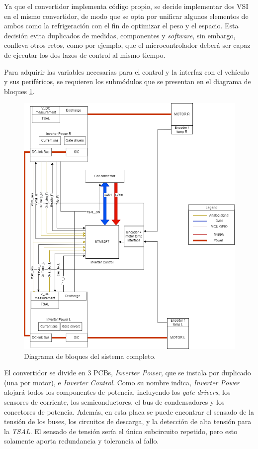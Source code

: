 Ya que el convertidor implementa código propio, se decide implementar dos VSI en el mismo convertidor, de modo que se opta por unificar algunos elementos de ambos como la refrigeración con el fin de optimizar el peso y el espacio. Esta decisión evita duplicados de medidas, componentes y \textit{software}, sin embargo, conlleva otros retos, como por ejemplo, que el microcontrolador deberá ser capaz de ejecutar los dos lazos de control al mismo tiempo.

Para adquirir las variables necesarias para el control y la interfaz con el vehículo y sus periféricos, se requieren los submódulos que se presentan en el diagrama de bloques \ref{blocksHardware}.

\begin{figure}[H]
	\centering
	\includegraphics[width=0.7\linewidth]{fig/Inverter_HW}
	\caption{Diagrama de bloques del sistema completo.}
	\label{blocksHardware}
\end{figure}

El convertidor se divide en 3 PCBs, \textit{Inverter Power}, que se instala por duplicado (una por motor), e \textit{Inverter Control}. Como su nombre indica, \textit{Inverter Power} alojará todos los componentes de potencia, incluyendo los \textit{gate drivers}, los sensores de corriente, los semiconductores, el bus de condensadores y los conectores de potencia. Además, en esta placa se puede encontrar el sensado de la tensión de los buses, los circuitos de descarga, y la detección de alta tensión para la \textit{TSAL}. El sensado de tensión sería el único subcircuito repetido, pero esto solamente aporta redundancia y tolerancia al fallo.

